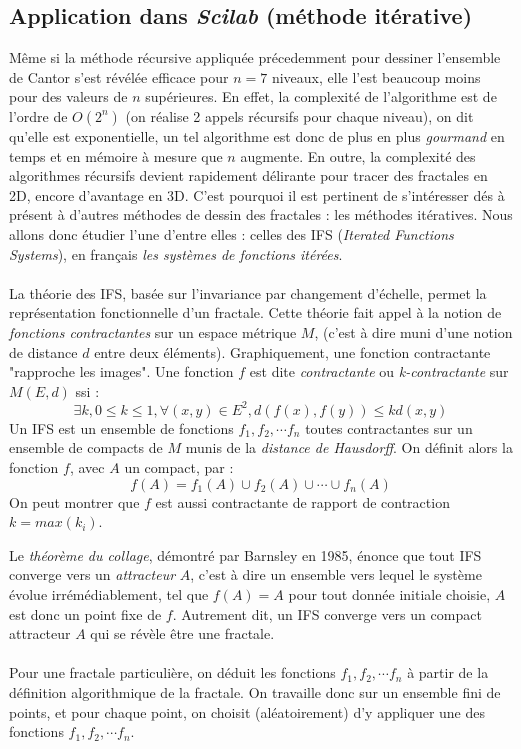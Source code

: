 \documentclass[a4paper,10pt]{report}
\begin{document}
\subsection{Application dans \textit{Scilab} (méthode itérative)}
Même si la méthode récursive appliquée précedemment pour dessiner l'ensemble de Cantor s'est révélée efficace pour $n=7$ niveaux, elle l'est beaucoup moins pour des valeurs de $n$ supérieures. En effet, la complexité de l'algorithme est de l'ordre de $O(2^n)$ (on réalise 2 appels récursifs pour chaque niveau), on dit qu'elle est exponentielle, un tel algorithme est donc de plus en plus \textit{gourmand} en temps et en mémoire à mesure que $n$ augmente. En outre, la complexité des algorithmes récursifs devient rapidement délirante pour tracer des fractales en 2D, encore d'avantage en 3D. C'est pourquoi il est pertinent de s'intéresser dés à présent à d'autres méthodes de dessin des fractales : les méthodes itératives. Nous allons donc étudier l'une d'entre elles : celles des IFS (\textit{Iterated Functions Systems}), en français \textit{les systèmes de fonctions itérées}.\\
\\
\indent La théorie des IFS, basée sur l'invariance par changement d'échelle, permet la représentation fonctionnelle d'un fractale. Cette théorie fait appel à la notion de \textit{fonctions contractantes} sur un espace métrique $M$, (c'est à dire muni d'une notion de distance $d$ entre deux éléments). Graphiquement, une fonction contractante "rapproche les images". Une fonction $f$ est dite \textit{contractante} ou \textit{k-contractante} sur $M(E,d)$ ssi :
\begin{equation}
\exists k, 0\leq k\leq 1, \forall (x,y) \in E^2, d(f(x),f(y))\leq kd(x,y)
\end{equation}
\indent Un IFS est un ensemble de fonctions $f_1,f_2,\cdots f_n$ toutes contractantes sur un ensemble de compacts de $M$ munis de la \textit{distance de Hausdorff}. On définit alors la fonction $f$, avec $A$ un compact, par :
\begin{equation}
f(A)=f_1(A)\cup f_2(A)\cup \cdots \cup f_n(A)
\end{equation}
On peut montrer que $f$ est aussi contractante de rapport de contraction $k=max(k_i)$.

\indent Le \textit{théorème du collage}, démontré par Barnsley en 1985, énonce que tout IFS converge vers un \textit{attracteur} $A$, c'est à dire un ensemble vers lequel le système évolue irrémédiablement, tel que $f(A)=A$ pour tout donnée initiale choisie, $A$ est donc un point fixe de $f$. Autrement dit, un IFS converge vers un compact attracteur $A$ qui se révèle être une fractale.
\\ \\
\indent Pour une fractale particulière, on déduit les fonctions $f_1,f_2,\cdots f_n$ à partir de la définition algorithmique de la fractale. On travaille donc sur un ensemble fini de points, et pour chaque point, on choisit (aléatoirement) d'y appliquer une des fonctions $f_1,f_2,\cdots f_n$. \\
\end{document}
